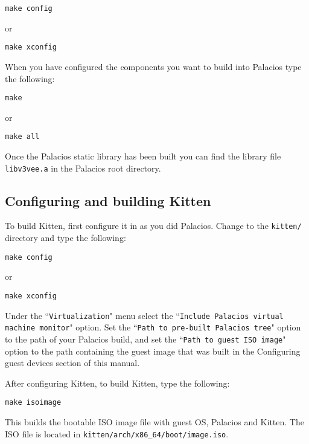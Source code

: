 \documentclass{article}[11pt]
\begin{document}
\begin{verbatim}
make config
\end{verbatim}
or
\begin{verbatim}
make xconfig
\end{verbatim}

\vspace{10pt}
\noindent
When you have configured the components you want to build into Palacios type
the following:

\begin{verbatim}
make
\end{verbatim}
or
\begin{verbatim}
make all
\end{verbatim}

\vspace{10pt}
\noindent
Once the Palacios static library has been built you can find the library file
\verb+libv3vee.a+ in the Palacios root directory.

\subsection*{Configuring and building Kitten}

To build Kitten, first configure it in as you did Palacios. Change to the
\verb+kitten/+ directory and type the following:

\begin{verbatim}
make config
\end{verbatim}
or
\begin{verbatim}
make xconfig
\end{verbatim}

\vspace{10pt}
\noindent
Under the ``\verb|Virtualization|" menu select the
``\verb|Include Palacios virtual machine monitor|" option. Set the
``\verb|Path to pre-built Palacios tree|" option to the path of your Palacios
build, and set the ``\verb|Path to guest ISO image|" option to the path
containing the guest image that was built in the Configuring guest devices
section of this manual.

\vspace{10pt}
\noindent
After configuring Kitten, to build Kitten, type the following:

\begin{verbatim}
make isoimage
\end{verbatim}

\vspace{10pt}
\noindent
This builds the bootable ISO image file with guest OS, Palacios and Kitten.
The ISO file is located in \verb+kitten/arch/x86_64/boot/image.iso+.
\end{document}
